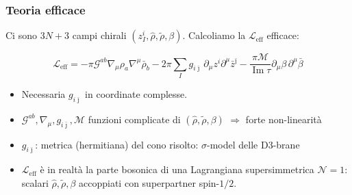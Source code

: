 \documentclass[aspectratio=43,mathserif]{beamer}
\newcommand{\ess}{\mathbb{S}}
\newcommand{\ssn}{\mathcal{N}}
\newcommand{\hatt}[1]{\ensuremath{\widehat{#1}}}
\newcommand{\tildd}[1]{\ensuremath{\widetilde{#1}}}
\renewcommand{\Im}{\ensuremath{\operatorname{Im}}}
\newcommand{\leff}{\ensuremath{\mathcal{L}_\text{eff}}}
\begin{document}
%
%


\begin{frame}
	\frametitle{Teoria efficace}
	Ci sono $3N+3$ campi chirali $(z_I^i, \hatt\rho, \tildd\rho, \beta)$. Calcoliamo la $\leff$ efficace:

	\begin{equation}
		\leff = - \pi \mathcal{G}^{ab} \nabla_\mu \rho_a \nabla^\mu \bar\rho_b - 2\pi \sum_I g_{i\bar\jmath}\, \partial_\mu z^i \partial^\mu \bar z^{\bar\jmath} - \frac{\pi\mathcal{M}}{\Im \tau} \partial_\mu \beta \,\partial^\mu \bar\beta
		\label{}
	\end{equation}

	\begin{itemize}
		\item Necessaria $g_{i\bar\jmath}$ in coordinate complesse.
		\item $\mathcal{G}^{ab},\nabla_\mu,g_{i\bar\jmath},\mathcal{M}$ funzioni complicate di $(\hatt\rho,\tildd\rho,\beta)$ $\Longrightarrow$ forte non-linearità
		\item $g_{i\bar\jmath}$: metrica (hermitiana) del cono risolto: $\sigma$-model delle D3-brane
		\item $\leff$ è in realtà la parte bosonica di una Lagrangiana supersimmetrica $\ssn=1$: scalari $\hatt\rho,\tildd\rho,\beta$ accoppiati con superpartner spin-$1/2$.
	\end{itemize}



\end{frame}
\end{document}
